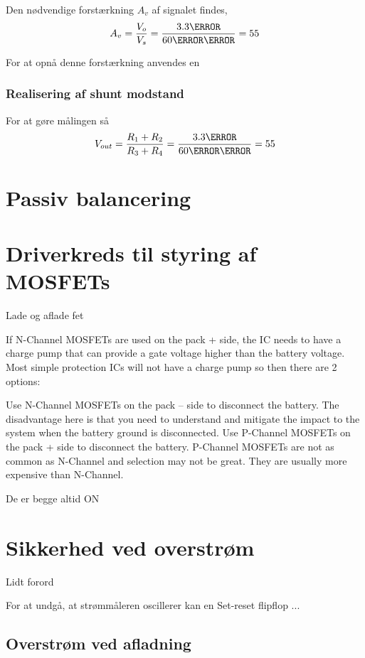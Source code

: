 Den nødvendige forstærkning $A_{v}$ af signalet findes,
\begin {equation} 
A_{v} = \frac{V_{o}}{V_{s}} = \frac{3.3\volt}{60\milli\volt} = 55
\end {equation}

For at opnå denne forstærkning anvendes en

\subsubsection{Realisering af shunt modstand}
For at gøre målingen så 
\begin {equation} 
V_{out} = \frac{R_{1}+R_{2}}{R_{3}+R_{4}} = \frac{3.3\volt}{60\milli\volt} = 55
\end {equation}
\section{Passiv balancering}

\section{Driverkreds til styring af MOSFETs}
Lade og aflade fet

If N-Channel MOSFETs are used on the pack + side, the IC needs to have a charge pump that can provide a gate voltage higher than the battery voltage.  Most simple protection ICs will not have a charge pump so then there are 2 options:

Use N-Channel MOSFETs on the pack – side to disconnect the battery.  The disadvantage here is that you need to understand and mitigate the impact to the system when the battery ground is disconnected.
Use P-Channel MOSFETs on the pack + side to disconnect the battery.  P-Channel MOSFETs are not as common as N-Channel and selection may not be great. They are usually more expensive than N-Channel.

De er begge altid ON

\section{Sikkerhed ved overstrøm}
Lidt forord

For at undgå, at strømmåleren oscillerer kan en Set-reset flipflop ...
\subsection{Overstrøm ved afladning}


